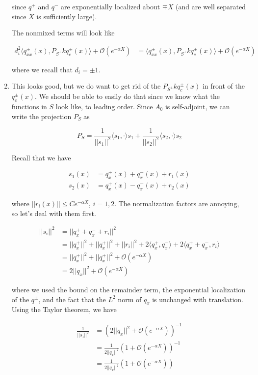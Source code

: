 \documentclass[12pt]{article}
\begin{document}
\begin{enumerate}
since $q^+$ and $q^-$ are exponentially localized about $\mp X$ (and are well separated since $X$ is sufficiently large).

The nonmixed terms will look like 

\begin{align*}
d_i^2 \langle q^\pm_{xx}(x), P_{S^\perp} k q^\pm_c(x) \rangle + \mathcal{O}(e^{-\alpha X}) 
&= \langle q^\pm_{xx}(x), P_{S^\perp} k q^\pm_c(x) \rangle + \mathcal{O}(e^{-\alpha X}) 
\end{align*}

where we recall that $d_i = \pm 1$.

\item This looks good, but we do want to get rid of the $P_{S^\perp} k q^\pm_c(x)$ in front of the $q^\pm_c(x)$. We should be able to easily do that since we know what the functions in $S$ look like, to leading order. Since $A_0$ is self-adjoint, we can write the projection $P_S$ as

\[
P_S = \frac{1}{||s_1||^2} \langle s_1, \cdot \rangle s_1 + \frac{1}{||s_2||^2} \langle s_2, \cdot \rangle s_2
\] 

Recall that we have

\begin{align*}
s_1(x) &= q^+_x(x) + q^-_x(x) + r_1(x) \\
s_2(x) &= q^+_x(x) - q^-_x(x) + r_2(x) 
\end{align*}

where $||r_i(x)|| \leq C e^{-\alpha X}$, $i = 1, 2$. The normalization factors are annoying, so let's deal with them first. 

\begin{align*}
||s_i||^2 &= ||q^+_x + q^-_x + r_i||^2 \\
&= ||q^+_x||^2 + ||q^+_x||^2 + ||r_i||^2 + 2\langle q^+_x, q^-_x \rangle 
+ 2 \langle q^+_x + q^-_x, r_i \rangle \\
&= ||q^+_x||^2 + ||q^+_x||^2 + \mathcal{O}(e^{-\alpha X}) \\
&= 2 ||q_x||^2 + \mathcal{O}(e^{-\alpha X})
\end{align*}

where we used the bound on the remainder term, the exponential localization of the $q^\pm$, and the fact that the $L^2$ norm of $q_x$ is unchanged with translation. Using the Taylor theorem, we have

\begin{align*}
\frac{1}{||s_1||^2} &= (2 ||q_x||^2 + \mathcal{O}(e^{-\alpha X}))^{-1} \\
&= \frac{1}{2 ||q_x||^2}(1 + \mathcal{O}(e^{-\alpha X}))^{-1} \\
&= \frac{1}{2 ||q_x||^2}(1 + \mathcal{O}(e^{-\alpha X}))
\end{align*}


\end{enumerate}
\end{document}
